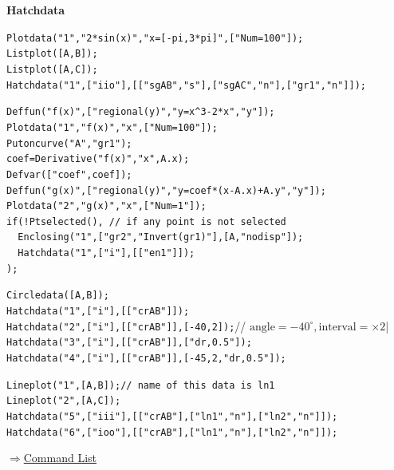 \documentclass[papersize,a4paper,12pt]{article}
\newenvironment{cmd}[2]{
\hypertarget{#2}{}
\begin{center}{\bf\large #1}\end{center}
\begin{description}
}{
\end{description}
\begin{flushright} \hyperlink{functionlist}{$\Rightarrow$Command List}\end{flushright}
}
\begin{document}
\begin{cmd}{Hatchdata}{hatchdata}
\verb|Plotdata("1","2*sin(x)","x=[-pi,3*pi]",["Num=100"]);|\\
\verb|Listplot([A,B]);|\\
\verb|Listplot([A,C]);|\\
\verb|Hatchdata("1",["iio"],[["sgAB","s"],["sgAC","n"],["gr1","n"]]);|

\begin{center}

\end{center}

\verb|Deffun("f(x)",["regional(y)","y=x^3-2*x","y"]);|\\
\verb|Plotdata("1","f(x)","x",["Num=100"]);|\\
\verb|Putoncurve("A","gr1");|\\
\verb|coef=Derivative("f(x)","x",A.x);|\\
\verb|Defvar(["coef",coef]);|\\
\verb|Deffun("g(x)",["regional(y)","y=coef*(x-A.x)+A.y","y"]);|\\
\verb|Plotdata("2","g(x)","x",["Num=1"]);|\\
\verb|if(!Ptselected(), // if any point is not selected|\\
\verb|  Enclosing("1",["gr2","Invert(gr1)"],[A,"nodisp"]);|\\
\verb|  Hatchdata("1",["i"],[["en1"]]);|\\
\verb|);|

\begin{center}

\end{center}

\verb|Circledata([A,B]);|\\
\verb|Hatchdata("1",["i"],[["crAB"]]);|\\
\verb|Hatchdata("2",["i"],[["crAB"]],[-40,2]);|// $\mbox{angle}=-40^{\circ}, \mbox{interval}=\times 2$|\\
\verb|Hatchdata("3",["i"],[["crAB"]],["dr,0.5"]);|\\
\verb|Hatchdata("4",["i"],[["crAB"]],[-45,2,"dr,0.5"]);|

\begin{center}

\end{center}

\verb|Lineplot("1",[A,B]);// name of this data is ln1|\\
\verb|Lineplot("2",[A,C]);|\\
\verb|Hatchdata("5",["iii"],[["crAB"],["ln1","n"],["ln2","n"]]);|\\
\verb|Hatchdata("6",["ioo"],[["crAB"],["ln1","n"],["ln2","n"]]);|


\end{cmd}
\end{document}
